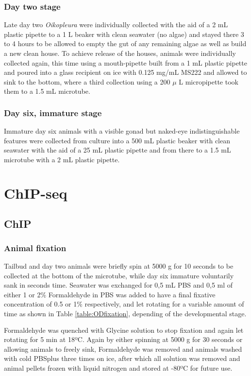 \documentclass[11pt,twoside,a4paper]{report}
\begin{document}
			\subsubsection{Day two stage}
			Late day two \textit{Oikopleura} were individually collected with the aid of a 2 mL plastic pipette to a 1 L beaker with clean seawater (no algae) and stayed there 3 to 4 hours to be allowed to empty the gut of any remaining algae as well as build a new clean house.
			To achieve release of the houses, animals were individually collected again, this time using a mouth-pipette built from a 1 mL plastic pipette and poured into a glass recipient on ice with 0.125 mg/mL MS222 and allowed to sink to the bottom, where a third collection using a 200 $\mu$
			L micropipette took them to a 1.5 mL microtube.
			
			\subsubsection{Day six, immature stage}
			Immature day six animals with a visible gonad but naked-eye indistinguishable features were collected from culture into a 500 mL plastic beaker with clean seawater with the aid of a 25 mL plastic pipette and from there to a 1.5 mL microtube with a 2 mL plastic pipette. 
		
	
	\section{ChIP-seq}
		\subsection{ChIP}
			\subsubsection{Animal fixation}
			Tailbud and day two animals were briefly spin at 5000 g for 10 seconds to be collected at the bottom of the microtube, while day six immature voluntarily sank in seconds time. Seawater was exchanged for 0,5 mL PBS and 0,5 ml of either 1 or 2\% Formaldehyde in PBS was added to have a final fixative concentration of 0.5 or 1\% respectively, and let rotating for a variable amount of time as shown in Table \ref{table:ODfixation}, depending of the developmental stage. %
			
			Formaldehyde was quenched with Glycine solution to stop fixation and again let rotating for 5 min at 18ºC. 
			Again by either spinning at 5000 g for 30 seconds or allowing animals to freely sink, Formaldehyde was removed and animals washed with cold PBSplus three times on ice, after which all solution was removed and animal pellets frozen with liquid nitrogen and stored at -80ºC for future use.
    
\end{document}
